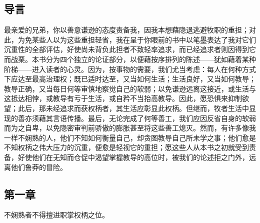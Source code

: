 
\subsection{导言}

\par

最亲爱的兄弟，你以善意谦逊的态度责备我，因我本想藉隐退逃避牧职的重担；对此，为免某些人以为这些重担轻省，我在呈于你眼前的书中以笔墨表达了我对它们沉重性的全部评估，好使尚未背负此担者不致轻率追求，而已经追求者则因得到它而战栗。本书分为四个独立的论证部分，以便藉按序排列的陈述——犹如藉着某种阶梯——进入读者的心灵。因为，按事物的需要，我们尤当考虑：每人在何种方式下应达至最高治理权；既已适时达至，又当如何生活；生活良好，又当如何教导；教导正确，又当每日何等审慎地察觉自己的软弱；以免谦逊远离这接近，或生活与这抵达相悖，或教导有亏于生活，或自矜不当抬高教导。因此，愿恐惧来抑制欲望；此后，那未经追求而获权柄者，其生活应彰显此权柄。但继而，牧者生活中显现的善亦须藉其言语传播。最后，无论完成了何等善工，我们应因反省自身的软弱而为之自卑，以免隐密审判前骄傲的膨胀甚至将这些善工熄灭。然而，有许多像我一样不娴熟的人，他们不知如何衡量自己，却贪图教导自己所未学之事；他们愈是不知权柄之伟大压力的沉重，便愈是轻视它的重担；愿这些人从本书之初就受到责备，好使他们在无知而仓促中渴望掌握教导的高位时，被我们的论述拒之门外，远离他们鲁莽的冒险。\par


\subsection{第一章}

不娴熟者不得擅进职掌权柄之位。\par

